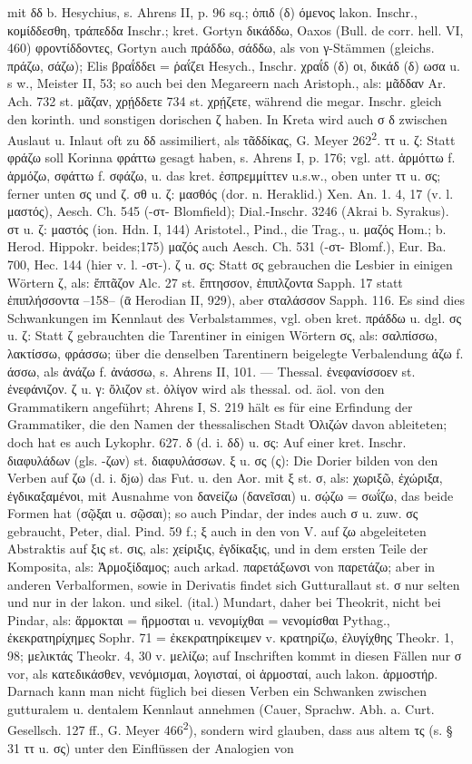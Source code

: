 mit δδ b. Hesychius, s. Ahrens II, p. 96 sq.; ὀπιδ (δ) όμενος lakon. Inschr., κομίδδεσθη, τράπεδδα  Inschr.; kret. Gortyn δικάδδω, Oaxos (Bull. de corr. hell. VI, 460) φροντίδδοντες, Gortyn auch πράδδω, σάδδω, als von γ-Stämmen (gleichs. πράζω, σάζω); Elis βραΐδδει = ῥαΐζει Hesych., Inschr. χραΐδ (δ) οι, δικάδ (δ) ωσα u. s w., Meister II, 53; so auch bei den Megareern nach Aristoph., als: μᾶδδαν Ar. Ach. 732 st. μᾶζαν, χρῄδδετε 734 st. χρῄζετε, während die megar. Inschr. gleich den korinth. und sonstigen dorischen ζ haben. In Kreta wird auch σ δ zwischen Auslaut u. Inlaut oft zu δδ assimiliert, als τᾶδδίκας, G. Meyer 262\textsuperscript{2}. ττ u. ζ: Statt φράζω soll Korinna φράττω gesagt haben, s. Ahrens I, p. 176; vgl. att. ἁρμόττω f. ἁρμόζω, σφάττω f. σφάζω, u. das kret. ἐσπρεμμίττεν u.s.w., oben unter ττ u. σς; ferner unten σς und ζ. σθ u. ζ: μασθός (dor. n. Heraklid.) Xen. An. 1. 4, 17 (v. l. μαστός), Aesch. Ch. 545 (-στ- Blomfield); Dial.-Inschr. 3246 (Akrai b. Syrakus). στ u. ζ: μαστός (ion. Hdn. I, 144) Aristotel., Pind., die Trag., u. μαζός Hom.; b. Herod. Hippokr. beides;175) μαζός auch Aesch. Ch. 531 (-στ- Blomf.), Eur. Ba. 700, Hec. 144 (hier v. l. -στ-). ζ u. σς: Statt σς gebrauchen die Lesbier in einigen Wörtern ζ, als: ἔπτᾶζον Alc. 27 st. ἔπτησσον, ἐπιπλζοντα Sapph. 17 statt ἐπιπλήσσοντα --158-- (ᾱ Herodian II, 929), aber σταλάσσον Sapph. 116. Es sind dies Schwankungen im Kennlaut des Verbalstammes, vgl. oben kret. πράδδω u. dgl. σς u. ζ: Statt ζ gebrauchten die Tarentiner in einigen Wörtern σς, als: σαλπίσσω, λακτίσσω, φράσσω; über die denselben Tarentinern beigelegte Verbalendung άζω f. άσσω, als ἀνάζω f. ἀνάσσω, s. Ahrens II, 101. — Thessal. ἐνεφανίσσοεν st. ἐνεφάνιζον. ζ u. γ: ὄλιζον st. ὀλίγον wird als thessal. od. äol. von den Grammatikern angeführt; Ahrens I, S. 219 hält es für eine Erfindung der Grammatiker, die den Namen der thessalischen Stadt Ὀλιζών davon ableiteten; doch hat es auch Lykophr. 627. δ (d. i. δδ) u. σς: Auf einer kret. Inschr. διαφυλάδων (gls. -ζων) st. διαφυλάσσων. ξ u. σς (ς): Die Dorier bilden von den Verben auf ζω (d. i. δjω) das Fut. u. den Aor. mit ξ st. σ, als: χωριξῶ, ἐχώριξα, ἐγδικαξαμένοι, mit Ausnahme von δανείζω (δανεῖσαι) u. σῴζω = σωΐζω, das beide Formen hat (σῷξαι u. σῷσαι); so auch Pindar, der indes auch σ u. zuw. σς gebraucht, Peter, dial. Pind. 59 f.; ξ auch in den von V. auf ζω abgeleiteten Abstraktis auf ξις st. σις, als: χείριξις, ἐγδίκαξις, und in dem ersten Teile der Komposita, als: Ἀρμοξίδαμος; auch arkad. παρετάξωνσι von παρετάζω; aber in anderen Verbalformen, sowie in Derivatis findet sich Gutturallaut st. σ nur selten und nur in der lakon. und sikel. (ital.) Mundart, daher bei Theokrit, nicht bei Pindar, als: ἅρμοκται = ἥρμοσται u. νενομίχθαι = νενομίσθαι Pythag., ἐκεκρατηρίχημες Sophr. 71 = ἐκεκρατηρίκειμεν v. κρατηρίζω, ἐλυγίχθης Theokr. 1, 98; μελικτάς Theokr. 4, 30 v. μελίζω; auf Inschriften kommt in diesen Fällen nur σ vor, als κατεδικάσθεν, νενόμισμαι, λογισταί, οἱ ἁρμοσταί, auch lakon. ἁρμοστήρ. Darnach kann man nicht füglich bei diesen Verben ein Schwanken zwischen gutturalem u. dentalem Kennlaut annehmen (Cauer, Sprachw. Abh. a. Curt. Gesellsch. 127 ff., G. Meyer 466\textsuperscript{2}), sondern wird glauben, dass aus altem τς (s. § 31 ττ u. σς) unter den Einflüssen der Analogien von 